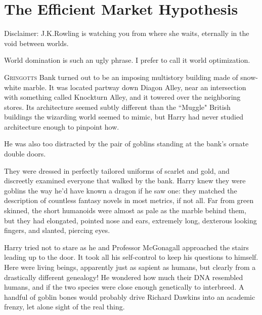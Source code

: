 \chapter[The Efficient Market Hypothesis]{The Efficient Market Hypothesis\protect\authorsnotefootnotemark}

\begin{chapterOpeningAuthorNote}
Disclaimer: J.\?K.\?Rowling is watching you from where she waits, eternally in the void between worlds.
\end{chapterOpeningAuthorNote}
\begin{chapterOpeningQuote}
World domination is such an ugly phrase. I prefer to call it world optimization.
\end{chapterOpeningQuote}


\lettrine{G}{ringotts} Bank turned out to be an imposing multistory building made of snow-white marble. It was located partway down Diagon Alley, near an intersection with something called Knockturn Alley, and it towered over the neighboring stores. Its architecture seemed subtly different than the ``Muggle" British buildings the wizarding world seemed to mimic, but Harry had never studied architecture enough to pinpoint how.

He was also too distracted by the pair of goblins standing at the bank's ornate double doors.

They were dressed in perfectly tailored uniforms of scarlet and gold, and discreetly examined everyone that walked by the bank. Harry knew they were goblins the way he'd have known a dragon if he saw one: they matched the description of countless fantasy novels in most metrics, if not all. Far from green skinned, the short humanoids were almost as pale as the marble behind them, but they had elongated, pointed nose and ears, extremely long, dexterous looking fingers, and slanted, piercing eyes.

Harry tried not to stare as he and Professor McGonagall approached the stairs leading up to the door. It took all his self-control to keep his questions to himself. Here were living beings, apparently just as sapient as humans, but clearly from a drastically different genealogy! He wondered how much their DNA resembled humans, and if the two species were close enough genetically to interbreed. A handful of goblin bones would probably drive Richard Dawkins into an academic frenzy, let alone sight of the real thing.

